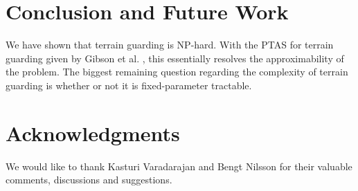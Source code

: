 \documentclass[11pt]{article}
\begin{document}
\section{Conclusion and Future Work}
We have shown that terrain guarding is NP-hard. With the PTAS for terrain guarding given by Gibson et al. \cite{G09}, this essentially resolves the approximability of the problem. The biggest remaining question regarding the complexity of terrain guarding is whether or not it is fixed-parameter tractable.

\section*{Acknowledgments}
We would like to thank Kasturi Varadarajan and Bengt Nilsson for their valuable comments, discussions and suggestions.





\newpage
\end{document}
